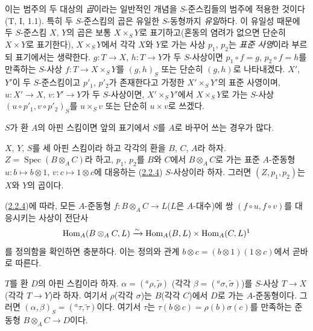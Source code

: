 이는 범주의 두 대상의 \emph{곱}이라는 일반적인 개념을
$S$-준스킴들의 범주에 적용한 것이다(T, I, 1.1). 특히 두
$S$-준스킴의 곱은 유일한 $S$-동형까지 \emph{유일}하다. 이 유일성
때문에 두 $S$-준스킴 $X$, $Y$의 곱은 보통 $X\times_S Y$로
표기하고(혼동의 염려가 없으면 단순히 $X\times Y$로 표기한다),
$X\times_S Y$에서 각각 $X$와 $Y$로 가는 사상 $p_1$, $p_2$는
\emph{표준 사영}이라 부르되 표기에서는 생략한다. $g:T\to X$,
$h:T\to Y$가 두 $S$-사상이면 $p_1\circ f=g$, $p_2\circ f=h$를
만족하는 $S$-사상 $f:T\to X\times_S Y$를 $(g,h)_S$ 또는 단순히
$(g,h)$로 나타내겠다. $X'$, $Y'$이 두 $S$-준스킴이고 $p'_1$,
$p'_2$가 존재한다고 가정한 $X'\times_S Y'$의 표준 사영이며,
$u:X'\to X$, $v:Y'\to Y$가 두 $S$-사상이면, $X'\times_S Y'$에서
$X\times_S Y$로 가는 $S$-사상 $(u\circ p'_1,v\circ p'_2)_S$를
$u\times_S v$ 또는 단순히 $u\times v$로 쓰겠다.

$S$가 환 $A$의 아핀 스킴이면 앞의 표기에서 $S$를 $A$로 바꾸어
쓰는 경우가 많다.

\begin{proposition}[3.2.2]
\label{I.3.2.2-ko}
$X$, $Y$, $S$를 세 아핀 스킴이라 하고 각각의 환을 $B$, $C$, $A$라
하자. $Z=\operatorname{Spec}(B\otimes_A C)$라 하고, $p_1$, $p_2$를
$B$와 $C$에서 $B\otimes_A C$로 가는 표준 $A$-준동형
$u:b\mapsto b\otimes1$, $v:c\mapsto1\otimes c$에 대응하는
(\hyperref[I.2.2.4-ko]{2.2.4}) $S$-사상이라 하자. 그러면
$(Z,p_1,p_2)$는 $X$와 $Y$의 곱이다.
\end{proposition}

(\hyperref[I.2.2.4-ko]{2.2.4})에 따라, 모든 $A$-준동형
$f:B\otimes_A C\to L$($L$은 $A$-대수)에 쌍
$(f\circ u,f\circ v)$를 대응시키는 사상이 전단사
\[
  \operatorname{Hom}_A(B\otimes_A C,L)\xrightarrow{\sim}
  \operatorname{Hom}_A(B,L)\times\operatorname{Hom}_A(C,L)\footnotemark
\]
를 정의함을 확인하면 충분하다. 이는 정의와
관계 $b\otimes c=(b\otimes1)(1\otimes c)$에서 곧바로 따른다.

\begin{corollary}[3.2.3]
\label{I.3.2.3-ko}
$T$를 환 $D$의 아핀 스킴이라 하자.
$\alpha=({}^a\rho,\widetilde{\rho})$
(각각 $\beta=({}^a\sigma,\widetilde{\sigma})$)를 $S$-사상 $T\to X$
(각각 $T\to Y$)라 하자. 여기서 $\rho$(각각 $\sigma$)는 $B$(각각
$C$)에서 $D$로 가는 $A$-준동형이다. 그러면
$(\alpha,\beta)_S=({}^a\tau,\widetilde{\tau})$이다. 여기서 $\tau$는
$\tau(b\otimes c)=\rho(b)\sigma(c)$를 만족하는 준동형
$B\otimes_A C\to D$이다.
\end{corollary}

